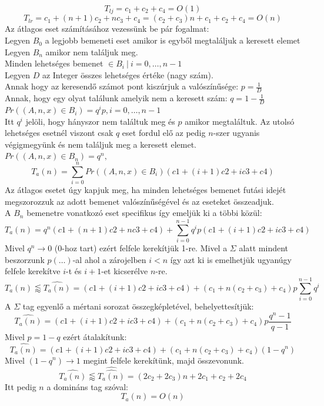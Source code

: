 \documentclass{article}
\theoremstyle{mytheoremstyle}
\theoremstyle{mytheoremstyle}
\theoremstyle{myproblemstyle}
\begin{document}
	$$T_{lj} = c_1+c_2+c_4 = O(1)$$
	$$T_{lr} = c_1+(n+1)c_2+nc_3+c_4=(c_2+c_3)n+c_1+c_2+c_4=O(n)$$
    Az átlagos eset számításához vezessünk be pár fogalmat:\\
    Legyen $B_0$ a legjobb bemeneti eset amikor is egyből megtaláljuk a keresett elemet\\
    Legyen $B_n$ amikor nem találjuk meg.\\
    Minden lehetséges bemenet $\in B_i\ |\ i=0,\ldots,n-1$ \\
    Legyen $D$ az Integer összes lehetséges értéke (nagy szám).\\ 
    Annak hogy az keresendő számot pont kiszúrjuk a valószínűsége: $p=\frac{1}{D}$\\
    Annak, hogy egy olyat találunk amelyik nem a keresett szám: $q=1-\frac{1}{D}$\\
    $Pr((A,n,x)\in B_i) = q^ip, i=0,\ldots,n-1$\\ 
    Itt $q^i$ jelöli, hogy hányszor nem találtuk meg és $p$ amikor megtaláltuk.
    Az utolsó lehetséges esetnél viszont csak $q$ eset fordul elő az pedig $n$-szer
    ugyanis végigmegyünk és nem találjuk meg a keresett elemet.
    $Pr((A,n,x)\in B_n) = q^n, $\\ 
	
    $$T_a(n) = \sum_{i=0}^n  Pr((A,n,x)\in B_i)(c1 + (i+1)c2 +ic3 +c4)$$
    Az átlagos esetet úgy kapjuk meg, ha minden lehetséges bemenet futási idejét 
    megszorozzuk az adott bemenet valószínűségével és az eseteket összeadjuk.\\
    A $B_n$ bemenetre vonatkozó eset specifikus így emeljük ki a többi közül:
    $$T_a(n) = q^n(c1 + (n+1)c2 +nc3 +c4)+\sum_{i=0}^{n-1} q^ip(c1 + (i+1)c2 +ic3 +c4)$$
    Mivel $q^n\to0$ (0-hoz tart) ezért felfele kerekítjük 1-re.
    Mivel a $\Sigma$ alatt mindent beszorzunk 
    $p(\ldots)$-al ahol a zárojelben $i<n$ így azt ki is emelhetjük ugyanúgy felfele 
    kerekítve $i$-t és $i+1$-et kicserélve $n$-re.
    $$T_a(n)\lessapprox\hat{T_a(n)}=(c1+(i+1)c2+ic3+c4)+(c_1+n(c_2+c_3)+c_4)p\sum_{i=0}^{n-1}q^i$$
    A $\Sigma$ tag egyenlő a mértani sorozat összegképletével, behelyettesítjük:
    $$\hat{T_a(n)}=(c1+(i+1)c2+ic3+c4)+(c_1+n(c_2+c_3)+c_4)p\frac{q^n-1}{q-1}$$
    Mivel $p=1-q$ ezért átalakítunk:
    $$\hat{T_a(n)}=(c1+(i+1)c2+ic3+c4)+(c_1+n(c_2+c_3)+c_4)(1-q^n)$$
    Mivel $(1-q^n)\to1$ megint felfele kerekítünk, majd összevonunk.
    $$\hat{T_a(n)}\lessapprox\hat{\hat{T_a(n)}}=(2c_2+2c_3)n+2c_1+c_2+2c_4$$
    Itt pedig $n$ a domináns tag szóval: 
    $$T_a(n)=O(n)$$
\end{document}
